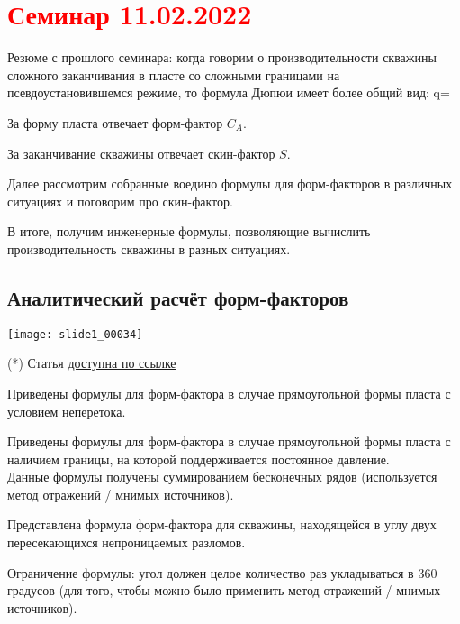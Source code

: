\documentclass[main.tex]{subfiles}
\begin{document}
\section{\textcolor{red}{Семинар 11.02.2022}}

Резюме с прошлого семинара: когда говорим о производительности скважины сложного заканчивания в пласте со сложными границами на псевдоустановившемся режиме, то формула Дюпюи имеет более общий вид:
\beq
q=
\eeq

За форму пласта отвечает форм-фактор $C_A$.

За заканчивание скважины отвечает скин-фактор $S$.

Далее рассмотрим собранные воедино формулы для форм-факторов в различных ситуациях и поговорим про скин-фактор.

В итоге, получим инженерные формулы, позволяющие вычислить производительность скважины в разных ситуациях.

\subsection{Аналитический расчёт форм-факторов}

\texttt{[image: slide1\_00034]}

(*) Статья \href{https://mualal.github.io/source/tex/hydrocarbons2022/articles/gringarten1978.pdf}{доступна по ссылке}


Приведены формулы для форм-фактора в случае прямоугольной формы пласта с условием неперетока.


Приведены формулы для форм-фактора в случае прямоугольной формы пласта с наличием границы, на которой поддерживается постоянное давление.\\

Данные формулы получены суммированием бесконечных рядов (используется метод отражений / мнимых источников).


Представлена формула форм-фактора для скважины, находящейся в углу двух пересекающихся непроницаемых разломов.

Ограничение формулы: угол должен целое количество раз укладываться в 360 градусов (для того, чтобы можно было применить метод отражений / мнимых источников).
\end{document}
